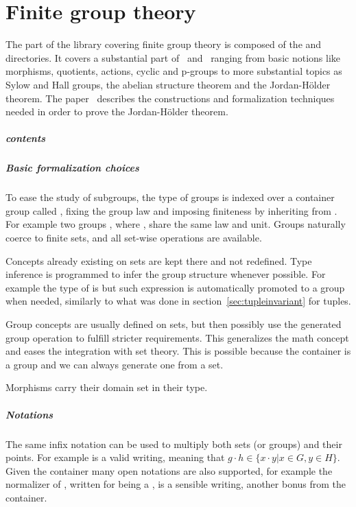 \chapter{Finite group theory}

The part of the library covering finite group theory is composed of
the  and  directories.  It covers a substantial
part of~\cite{gorenstein2007finite} and~\cite{9781139175319} ranging from
basic notions like morphisms, quotients, actions, cyclic and p-groups to more
substantial topics as Sylow and Hall groups, the abelian
structure theorem and the Jordan-H\"older theorem.
The paper~\cite{DBLP:conf/mkm/Mahboubi13}
describes the constructions and formalization techniques
needed in order to prove the Jordan-H\"older theorem.

\paragraph{contents}


\paragraph{Basic formalization choices} To ease the study of subgroups,
the type of groups is indexed over a container group called
, fixing the group law and imposing finiteness by
inheriting from .
For example two groups ,
where , share the same law and unit.  Groups
naturally coerce to finite sets, and all set-wise operations are available.

Concepts already existing on sets are kept there and not redefined.
Type inference is programmed to infer the group structure whenever possible.
For example the type of  is  but such expression
is automatically promoted to a group when needed, similarly to what
was done in section~\ref{sec:tupleinvariant} for tuples.

Group concepts are usually defined on sets, but then
possibly use the generated group operation to fulfill
stricter requirements.  This generalizes the math concept and
eases the integration with set theory.  This is possible because
the container is a group and we can always generate one from a set.

Morphisms carry their domain set in their type.

\paragraph{Notations} The same infix \C{*} notation can be used to
multiply both sets (or groups) and their points.  For example
 is a valid writing, meaning that
$g\cdot h \in \{ x\cdot y | x \in G, y \in H\}$.  Given the 
container many open notations are also supported, for example the normalizer
of , written  for  being a , is a sensible
writing, another bonus from the container.

